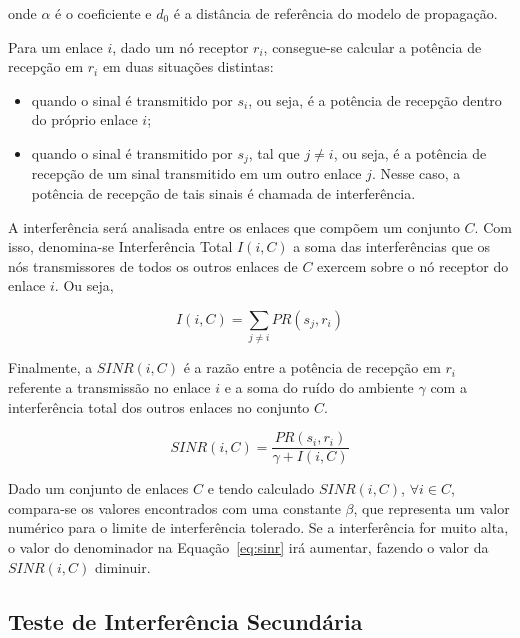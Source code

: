 onde $\alpha$ é o coeficiente e $d_{0}$ é a distância de referência do modelo de propagação.

Para um enlace $i$, dado um nó receptor $r_{i}$, consegue-se calcular a potência de recepção em $r_{i}$ em duas situações distintas:

\begin{itemize} %

\item quando o sinal é transmitido por $s_{i}$, ou seja, é a potência de recepção dentro do próprio enlace $i$; 
\item quando o sinal é transmitido por $s_{j}$, tal que $j \neq i$, ou seja, é a potência de recepção de um sinal transmitido em um outro enlace $j$. Nesse caso, a potência de recepção de tais sinais é chamada de interferência. 

\end{itemize}

A interferência será analisada entre os enlaces que compõem um conjunto $C$. Com isso, denomina-se Interferência Total $I(i,C)$ a soma das interferências que os nós transmissores de todos os outros enlaces de $C$ exercem sobre o nó receptor do enlace $i$. Ou seja,

\begin{equation}
I(i,C) = \sum_{j \neq i} PR(s_{j},r_{i})
\end{equation}

Finalmente, a $SINR(i,C)$ é a razão entre a potência de recepção em $r_{i}$ referente a transmissão no enlace $i$ e a soma do ruído do ambiente $\gamma$ com a interferência total dos outros enlaces no conjunto $C$.

\begin{equation}
SINR(i,C) = \frac{PR(s_{i},r_{i})} {\gamma + I(i,C)}
\label{eq:sinr}  
\end{equation}

Dado um conjunto de enlaces $C$ e tendo calculado $SINR(i,C)$, $\forall i \in C$, compara-se os valores encontrados com uma constante $\beta$, que representa um valor numérico para o limite de interferência tolerado. Se a interferência for muito alta, o valor do denominador na Equação~\ref{eq:sinr} irá aumentar, fazendo o valor da $SINR(i,C)$ diminuir. 

\subsection{Teste de Interferência Secundária}

